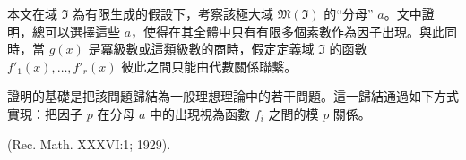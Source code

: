 \documentclass[11pt]{article}
\begin{document}
本文在域 $\mathfrak{I}$ 為有限生成的假設下，考察該極大域 $\mathfrak{M}(\mathfrak{I})$ 的“分母” $a$。文中證明，總可以選擇這些 $a$，使得在其全體中只有有限多個素數作為因子出現。與此同時，當 $g(x)$ 是冪級數或這類級數的商時，假定定義域 $\mathfrak{I}$ 的函數 $f'_1(x),\ldots,f'_r(x)$ 彼此之間只能由代數關係聯繫。

證明的基礎是把該問題歸結為一般理想理論中的若干問題。這一歸結通過如下方式實現：把因子 $p$ 在分母 $a$ 中的出現視為函數 $f_i$ 之間的模 $p$ 關係。

\begin{center}
(Rec. Math. XXXVI:1; 1929).
\end{center}
\endgroup

\setcounter{footnote}{0}
\clearpage
\end{document}
